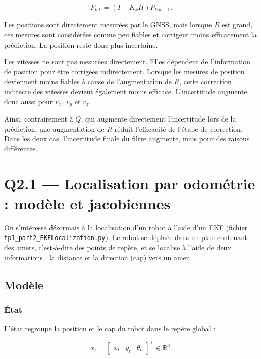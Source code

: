 \documentclass[11pt]{article}
\theoremstyle{remark}
\theoremstyle{definition}
\begin{document}
\begin{equation}
P_{k|k}=(I-K_kH)P_{k|k-1}.
\end{equation}

Les positions sont directement mesurées par le GNSS, mais lorsque $R$ est
grand, ces mesures sont considérées comme peu fiables et corrigent moins
efficacement la prédiction. La position reste donc plus incertaine.

Les vitesses ne sont pas mesurées directement. Elles dépendent de
l'information de position pour être corrigées indirectement. Lorsque les
mesures de position deviennent moins fiables à cause de l'augmentation de
$R$, cette correction indirecte des vitesses devient également moins
efficace. L'incertitude augmente donc aussi pour $v_x$, $v_y$ et $v_z$.

Ainsi, contrairement à $Q$, qui augmente directement l'incertitude lors de
la prédiction, une augmentation de $R$ réduit l'efficacité de l'étape de
correction. Dans les deux cas, l'incertitude finale du filtre augmente,
mais pour des raisons différentes.

\section{Q2.1 --- Localisation par odométrie : modèle et jacobiennes}

On s'intéresse désormais à la localisation d'un robot à l'aide d'un EKF (fichier
\texttt{tp1\_part2\_EKFLocalization.py}). Le robot se déplace dans un plan contenant des
amers, c'est-à-dire des points de repère, et se localise à l'aide de deux
informations : la distance et la direction (cap) vers un amer.

\subsection{Modèle}

\subsubsection{État}

L'état regroupe la position et le cap du robot dans le repère global :

\begin{equation}
x_t = \begin{bmatrix} x_t & y_t & \theta_t \end{bmatrix}^\top \in \mathbb{R}^3 .
\end{equation}
\end{document}
